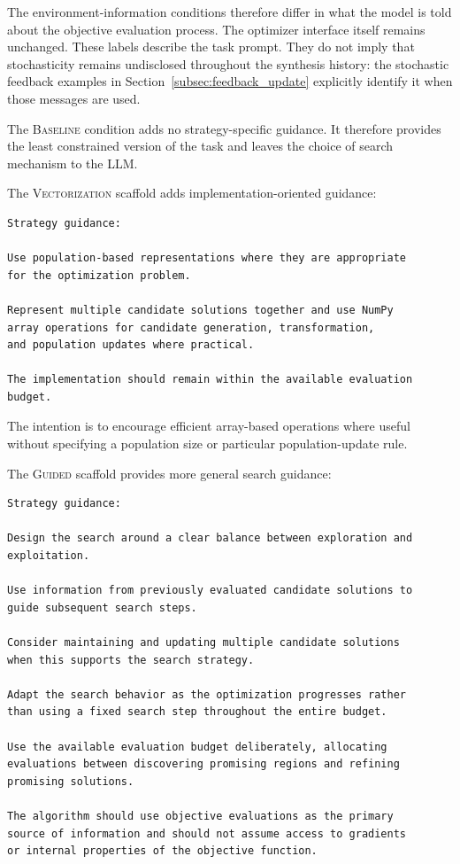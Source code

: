 The environment-information conditions therefore differ in what the model is
told about the objective evaluation process. The optimizer interface itself
remains unchanged.
These labels describe the task prompt. They do not imply that stochasticity
remains undisclosed throughout the synthesis history: the stochastic
feedback examples in Section~\ref{subsec:feedback_update} explicitly
identify it when those messages are used.


The \textsc{Baseline} condition adds no strategy-specific guidance. It
therefore provides the least constrained version of the task and leaves the
choice of search mechanism to the LLM.

The \textsc{Vectorization} scaffold adds implementation-oriented guidance:

\begin{verbatim}
Strategy guidance:

Use population-based representations where they are appropriate
for the optimization problem.

Represent multiple candidate solutions together and use NumPy
array operations for candidate generation, transformation,
and population updates where practical.

The implementation should remain within the available evaluation
budget.
\end{verbatim}

The intention is to encourage efficient array-based operations where useful
without specifying a population size or particular population-update rule.

The \textsc{Guided} scaffold provides more general search guidance:

\begin{verbatim}
Strategy guidance:

Design the search around a clear balance between exploration and
exploitation.

Use information from previously evaluated candidate solutions to
guide subsequent search steps.

Consider maintaining and updating multiple candidate solutions
when this supports the search strategy.

Adapt the search behavior as the optimization progresses rather
than using a fixed search step throughout the entire budget.

Use the available evaluation budget deliberately, allocating
evaluations between discovering promising regions and refining
promising solutions.

The algorithm should use objective evaluations as the primary
source of information and should not assume access to gradients
or internal properties of the objective function.
\end{verbatim}

